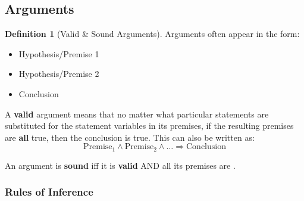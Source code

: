 \documentclass{article}
\theoremstyle{plain}
\theoremstyle{definition}
\newtheorem*{definition}{Definition}
\theoremstyle{remark}
\begin{document}
\subsection{Arguments}

\begin{definition}[Valid \& Sound Arguments]
Arguments often appear in the form:
\begin{center}
    \begin{minipage}{0.4\linewidth}
        \begin{itemize}
            \item[] Hypothesis/Premise 1
            \item[] Hypothesis/Premise 2
            \item[$\therefore$] Conclusion
        \end{itemize}
    \end{minipage}
\end{center}

A \textbf{valid} argument means that no matter what particular statements are substituted for the statement variables in its premises, if the resulting premises are \textbf{all} true, then the conclusion is true.
This can also be written as:
\[ \text{Premise}_1 \wedge \text{Premise}_2 \wedge \dots \Rightarrow \text{Conclusion} \]

An argument is \textbf{sound} iff it is \textbf{valid} AND all its premises are \textcolor{blue}{}.
\end{definition}

\subsubsection{Rules of Inference}
\end{document}
